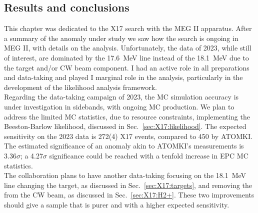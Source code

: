 \begin{refsection}
\section{Results and conclusions}
    This chapter was dedicated to the X17 search with the MEG II apparatus.
    After a summary of the anomaly under study we saw how the search is ongoing in MEG II, with details on the analysis. 
    Unfortunately, the data of 2023, while still of interest, are dominated by the \SI{17.6}{MeV} line instead of the \SI{18.1}{MeV} due to the target and/or  CW beam component. 
    I had an active role in all preparations and data-taking and played I marginal role in the analysis, particularly in the development of the likelihood analysis framework.\\
    
    \noindent
    Regarding the data-taking campaign of 2023, the MC simulation accuracy is under investigation in sidebands, with ongoing MC production. 
    We plan to address the limited MC statistics, due to resource constraints, implementing the Beeston-Barlow likelihood, discussed in Sec.~\ref{sec:X17:likelihood}. 
    The expected sensitivity on the 2023 data is 272(4) X17 events, compared to 450 by ATOMKI.
    The estimated significance of an anomaly akin to ATOMKI's measurements is 3.36$\sigma$; a 4.27$\sigma$ significance could be reached with a tenfold increase in EPC MC statistics.\\
    
    \noindent
    The collaboration plans to have another data-taking focusing on the \SI{18.1}{MeV} line changing the target, as discussed in Sec.~\ref{sec:X17:targets}, and removing the  from the CW beam, as discussed in Sec.~\ref{sec:X17:H2+}. 
    These two improvements should give a sample that is purer and with a higher expected sensitivity.




\cite{X17:1996} \cite{X17:nuclear:2004} \cite{X17:Krasznahorkay:2015} \cite{X17:Ellwanger:2016} \cite{X17:Feng:2016} \cite{X17_Kozaczuk:2017} \cite{X17:Krasznahorkay:2017} \cite{X17:2019} \cite{X17:2021} 

\printbibliography[
    heading = bibliographychapter,
    title=Bibliography on X17
]

\end{refsection}
